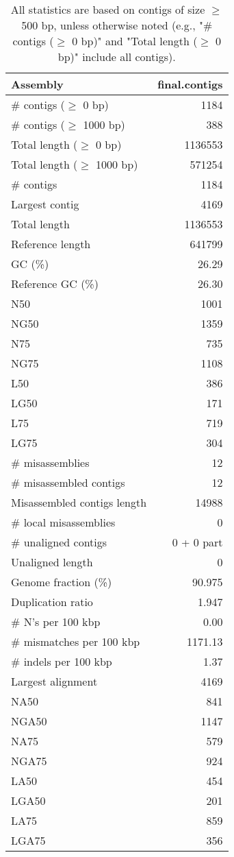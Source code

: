 \documentclass[12pt,a4paper]{article}
\begin{document}
\begin{table}[ht]
\begin{center}
\caption{All statistics are based on contigs of size $\geq$ 500 bp, unless otherwise noted (e.g., "\# contigs ($\geq$ 0 bp)" and "Total length ($\geq$ 0 bp)" include all contigs).}
\begin{tabular}{|l*{1}{|r}|}
\hline
Assembly & final.contigs \\ \hline
\# contigs ($\geq$ 0 bp) & 1184 \\ \hline
\# contigs ($\geq$ 1000 bp) & 388 \\ \hline
Total length ($\geq$ 0 bp) & 1136553 \\ \hline
Total length ($\geq$ 1000 bp) & 571254 \\ \hline
\# contigs & 1184 \\ \hline
Largest contig & 4169 \\ \hline
Total length & 1136553 \\ \hline
Reference length & 641799 \\ \hline
GC (\%) & 26.29 \\ \hline
Reference GC (\%) & 26.30 \\ \hline
N50 & 1001 \\ \hline
NG50 & 1359 \\ \hline
N75 & 735 \\ \hline
NG75 & 1108 \\ \hline
L50 & 386 \\ \hline
LG50 & 171 \\ \hline
L75 & 719 \\ \hline
LG75 & 304 \\ \hline
\# misassemblies & 12 \\ \hline
\# misassembled contigs & 12 \\ \hline
Misassembled contigs length & 14988 \\ \hline
\# local misassemblies & 0 \\ \hline
\# unaligned contigs & 0 + 0 part \\ \hline
Unaligned length & 0 \\ \hline
Genome fraction (\%) & 90.975 \\ \hline
Duplication ratio & 1.947 \\ \hline
\# N's per 100 kbp & 0.00 \\ \hline
\# mismatches per 100 kbp & 1171.13 \\ \hline
\# indels per 100 kbp & 1.37 \\ \hline
Largest alignment & 4169 \\ \hline
NA50 & 841 \\ \hline
NGA50 & 1147 \\ \hline
NA75 & 579 \\ \hline
NGA75 & 924 \\ \hline
LA50 & 454 \\ \hline
LGA50 & 201 \\ \hline
LA75 & 859 \\ \hline
LGA75 & 356 \\ \hline
\end{tabular}
\end{center}
\end{table}
\end{document}
